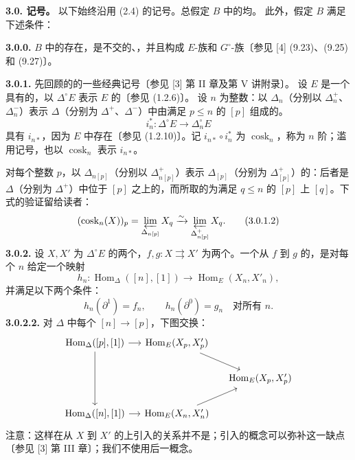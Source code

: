 \textbf{3.0. 记号。} 以下始终沿用 (2.4) 的记号。总假定 $B$ 中的均。
此外，假定 $B$ 满足下述条件：

\textbf{3.0.0.} $B$ 中的存在，是不交的、，并且构成 $E$-族和 $G^\circ$-族〔参见 [4] (9.23)、(9.25) 和 (9.27)〕。

\textbf{3.0.1.} 先回顾的的一些经典记号〔参见 [3] 第 II 章及第 V 讲附录〕。
设 $E$ 是一个具有的，以 $\Delta^\circ E$ 表示 $E$ 的〔参见 (1.2.6)〕。
设 $n$ 为整数：以 $\Delta_n$（分别以 $\Delta_n^+$、$\Delta_n^-$）表示 $\Delta$（分别为 $\Delta^+$、$\Delta^-$）中由满足 $p\leq n$ 的 $[p]$ 组成的。
\[
i_n^*:\Delta^\circ E\longrightarrow\Delta_n^\circ E \tag{3.0.1.1}
\]
具有 $i_{n*}$，因为 $E$ 中存在〔参见 (1.2.10)〕。记 $i_{n*}\circ i_n^*$ 为 $\operatorname{cosk}_n$，称为 $n$ 阶；滥用记号，也以 $\operatorname{cosk}_n$ 表示 $i_{n*}$。

对每个整数 $p$，以 $\Delta_{n[p]}$（分别以 $\Delta^+_{n[p]}$）表示 $\Delta_{[p]}$（分别为 $\Delta^+_{[p]}$）的：后者是 $\Delta$（分别为 $\Delta^+$）中位于 $[p]$ 之上的，而所取的为满足 $q\leq n$ 的 $[p]$ 上 $[q]$。下式的验证留给读者：
\[
(\operatorname{cosk}_n(X))_p=\varprojlim_{\Delta_{n[p]}}X_q
 \xrightarrow{\sim}\varprojlim_{\Delta^+_{n[p]}}X_q. \tag{3.0.1.2}
\]
\textbf{3.0.2.} 设 $X,X'$ 为 $\Delta^\circ E$ 的两个，$f,g:X\rightrightarrows X'$ 为两个。一个从 $f$ 到 $g$ 的，是对每个 $n$ 给定一个映射
\[
h_n:\operatorname{Hom}_\Delta([n],[1])\longrightarrow\operatorname{Hom}_E(X_n,X'_n),
\]
并满足以下两个条件：
\[
h_n(\partial^1)=f_n,\qquad h_n(\partial^0)=g_n\quad\text{对所有 }n. \tag{3.0.2.1}
\]
\textbf{3.0.2.2.} 对 $\Delta$ 中每个 $[n]\to[p]$，下图交换：
\[
\begin{tikzcd}[column sep=small]
\operatorname{Hom}_\Delta([p],[1])\arrow[r]\arrow[dd]&\operatorname{Hom}_E(X_p,X'_p)\arrow[dr]&\\
&&\operatorname{Hom}_E(X_p,X'_p)\\
\operatorname{Hom}_\Delta([n],[1])\arrow[r]&\operatorname{Hom}_E(X_n,X'_n)\arrow[ur]&
\end{tikzcd}
\]
注意：这样在从 $X$ 到 $X'$ 的上引入的关系并不是；引入的概念可以弥补这一缺点〔参见 [3] 第 III 章〕；我们不使用后一概念。

